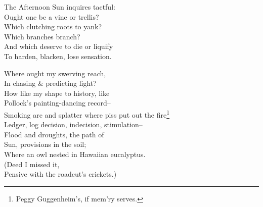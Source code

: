 \secdiv

The Afternoon Sun inquires tactful: \\
Ought one be a vine or trellis? \\
Which clutching roots to yank? \\
Which branches branch? \\
And which deserve to die or liquify \\
To harden, blacken, lose sensation.

Where ought my swerving reach, \\
In chasing \& predicting light? \\
How like my shape to history, like \\
Pollock's painting-dancing record-- \\
Smoking arc and splatter where piss put out the fire\footnote{Peggy Guggenheim's, if mem'ry serves.} \\

Ledger, log decision, indecision, stimulation-- \\
Flood and droughts, the path of \\
Sun, provisions in the soil; \\
Where an owl nested in Hawaiian eucalyptus. \\
(Deed I missed it, \\
Pensive with the roadcut's crickets.)
